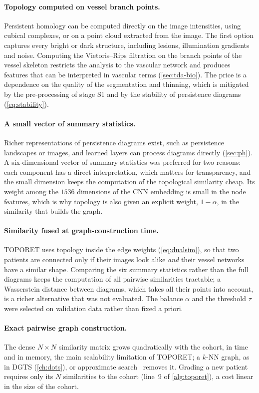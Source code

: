 \paragraph{Topology computed on vessel branch points.}
Persistent homology can be computed directly on the image intensities, using cubical
complexes, or on a point cloud extracted from the image. The first option captures every
bright or dark structure, including lesions, illumination gradients and noise. Computing
the Vietoris--Rips filtration on the branch points of the vessel skeleton restricts the
analysis to the vascular network and produces features that can be interpreted in
vascular terms (\cref{sec:tda-bio}). The price is a dependence on the quality of the
segmentation and thinning, which is mitigated by the pre-processing of stage S1 and by
the stability of persistence diagrams (\cref{eq:stability}).

\paragraph{A small vector of summary statistics.}
Richer representations of persistence diagrams exist, such as persistence landscapes or
images, and learned layers can process diagrams directly (\cref{sec:ph}). A
six-dimensional vector of summary statistics was preferred for two reasons: each component
has a direct interpretation, which matters for transparency, and the small dimension keeps
the computation of the topological similarity cheap. Its weight among the $1536$ dimensions
of the CNN embedding is small in the node features, which is why topology is also given an
explicit weight, $1-\alpha$, in the similarity that builds the graph.

\paragraph{Similarity fused at graph-construction time.}
TOPORET uses topology inside the edge weights (\cref{eq:dualsim}), so that two patients are
connected only if their images look alike \emph{and} their vessel networks have a similar
shape. Comparing the six summary statistics rather than the full diagrams keeps the
computation of all pairwise similarities tractable; a Wasserstein distance between
diagrams, which takes all their points into account, is a richer alternative that was not
evaluated. The balance $\alpha$ and the threshold $\tau$ were selected on validation data
rather than fixed a priori.

\paragraph{Exact pairwise graph construction.}
The dense $N\times N$ similarity matrix grows quadratically with the cohort, in time and in
memory, the main scalability limitation of TOPORET; a $k$-NN graph, as in DGTS
(\cref{ch:dots}), or approximate search~\cite{johnson2021faiss} removes it. Grading a new
patient requires only its $N$ similarities to the cohort (line~9 of \cref{alg:toporet}), a
cost linear in the size of the cohort.

